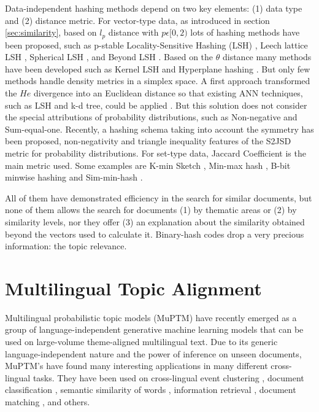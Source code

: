 Data-independent hashing methods depend on two key elements: (1) data type and (2) distance metric. For vector-type data, as introduced in section \ref{sec:similarity}, based on $l_p$ distance with $p \epsilon [0,2)$ lots of hashing methods have been proposed, such as p-stable Locality-Sensitive Hashing (LSH) \cite{Datar2004}, Leech lattice LSH \cite{Andoni2006}, Spherical LSH \cite{Terasawa2007}, and Beyond LSH \cite{Andoni2014}. Based on the $\theta$ distance many methods have been developed such as Kernel LSH \cite{Kulis2012} and Hyperplane hashing \cite{Vijayanarasimhan2014}. But only few methods handle density metrics in a simplex space. A first approach transformed the $He$ divergence into an Euclidean distance so that existing ANN techniques, such as LSH and k-d tree, could be applied \cite{Krstovski2013a}. But this solution does not consider the special attributions of probability distributions, such as Non-negative and Sum-equal-one. Recently, a hashing schema \cite{Mao2017} taking into account the symmetry has been proposed, non-negativity and triangle inequality features of the S2JSD metric for probability distributions. For set-type data, Jaccard Coefficient is the main metric used. Some examples are K-min Sketch \cite{Li2012}, Min-max hash \cite{Ji2013}, B-bit minwise hashing \cite{Li2010b} and Sim-min-hash \cite{Zhao2013}.

All of them have demonstrated efficiency in the search for similar documents, but none of them allows the search for documents (1) by thematic areas or (2) by similarity levels, nor they offer (3) an explanation about the similarity obtained beyond the vectors used to calculate it. Binary-hash codes drop a very precious information: the topic relevance.


\section{Multilingual Topic Alignment}

Multilingual probabilistic topic models (MuPTM) \cite{Vulic2015} have recently emerged as a group of language-independent generative machine learning models that can be used on large-volume theme-aligned multilingual text. Due to its generic language-independent nature and the power of inference on unseen documents, MuPTM's have found many interesting applications in many different cross-lingual tasks. They have been used on cross-lingual event clustering \cite{DeSmet2009}, document classification \cite{10.1007/978-3-642-20841-6_45} \cite{Ni:2011:CLT:1935826.1935887},  semantic similarity of words \cite{Mimno:2009:PTM:1699571.1699627}  \cite{Vulic:2012:DHC:2380816.2380872}, information retrieval \cite{10.1007/978-3-642-36973-5_9} \cite{ganguly-etal-2012-cross}, document matching \cite{Platt:2010:TDR:1870658.1870683} \cite{zhu-etal-2013-building}, and others. 

